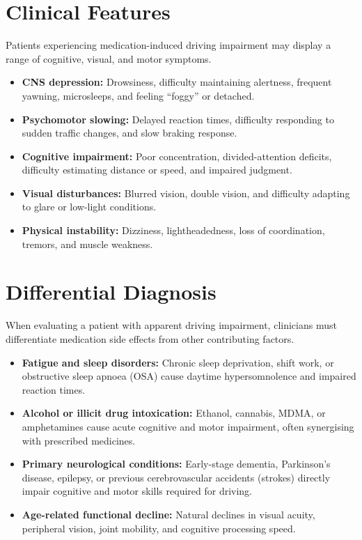 \section*{Clinical Features}
Patients experiencing medication-induced driving impairment may display a range of cognitive, visual, and motor symptoms.
\begin{itemize}
    \item \textbf{CNS depression:} Drowsiness, difficulty maintaining alertness, frequent yawning, microsleeps, and feeling ``foggy'' or detached.
    \item \textbf{Psychomotor slowing:} Delayed reaction times, difficulty responding to sudden traffic changes, and slow braking response.
    \item \textbf{Cognitive impairment:} Poor concentration, divided-attention deficits, difficulty estimating distance or speed, and impaired judgment.
    \item \textbf{Visual disturbances:} Blurred vision, double vision, and difficulty adapting to glare or low-light conditions.
    \item \textbf{Physical instability:} Dizziness, lightheadedness, loss of coordination, tremors, and muscle weakness.
\end{itemize}

\section*{Differential Diagnosis}
When evaluating a patient with apparent driving impairment, clinicians must differentiate medication side effects from other contributing factors.
\begin{itemize}
    \item \textbf{Fatigue and sleep disorders:} Chronic sleep deprivation, shift work, or obstructive sleep apnoea (OSA) cause daytime hypersomnolence and impaired reaction times.
    \item \textbf{Alcohol or illicit drug intoxication:} Ethanol, cannabis, MDMA, or amphetamines cause acute cognitive and motor impairment, often synergising with prescribed medicines.
    \item \textbf{Primary neurological conditions:} Early-stage dementia, Parkinson's disease, epilepsy, or previous cerebrovascular accidents (strokes) directly impair cognitive and motor skills required for driving.
    \item \textbf{Age-related functional decline:} Natural declines in visual acuity, peripheral vision, joint mobility, and cognitive processing speed.
\end{itemize}

